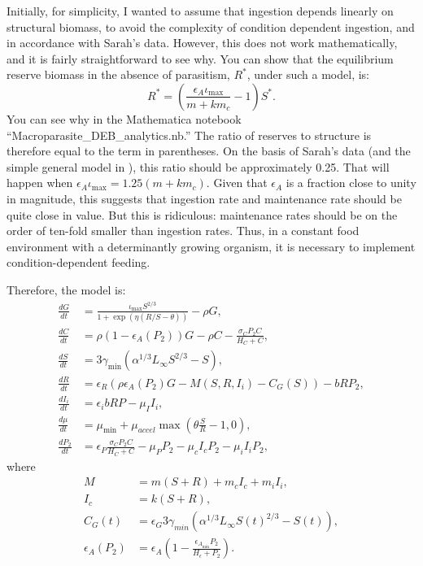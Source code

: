 \documentclass[12pt,reqno,final,pdftex]{amsart}\usepackage[]{graphicx}\usepackage[]{color}
\theoremstyle{plain}
\numberwithin{equation}{part}
\begin{document}
Initially, for simplicity, I wanted to assume that ingestion depends linearly on structural biomass, to avoid the complexity of condition dependent ingestion, and in accordance with Sarah's data.
However, this does not work mathematically, and it is fairly straightforward to see why.
You can show that the equilibrium reserve biomass in the absence of parasitism, $R^*$, under such a model, is:
\begin{equation}
R^* = \left(\frac{\epsilon_A \iota_{\max}}{m + k m_c} - 1 \right) S^*.
\end{equation}
You can see why in the Mathematica notebook ``Macroparasite\_DEB\_analytics.nb.''
The ratio of reserves to structure is therefore equal to the term in parentheses.
On the basis of Sarah's data (and the simple general model in \citep{deRoos2013}), this ratio should be approximately 0.25.
That will happen when $\epsilon_A \iota_{\max} = 1.25(m + k m_c)$. Given that $\epsilon_A$ is a fraction close to unity in magnitude, this suggests that ingestion rate and maintenance rate should be quite close in value.
But this is ridiculous: maintenance rates should be on the order of ten-fold smaller than ingestion rates.
Thus, in a constant food environment with a determinantly growing organism, it is necessary to implement condition-dependent feeding.

Therefore, the model is:
\begin{align}
\frac{dG}{dt} &= \frac{\iota_{\max}S^{2/3}}{1 + \exp\left(\eta(R/S-\theta)\right)} - \rho G, \\
\frac{dC}{dt} &= \rho (1-\epsilon_A(P_2))G - \rho C - \frac{\sigma_C P_2 C}{H_C + C}, \\
\frac{dS}{dt} &= 3\gamma_{\min} \left(\alpha^{1/3}L_{\infty }S^{2/3}-S\right), \\
\frac{dR}{dt} &= \epsilon_R\left(\rho \epsilon_A(P_2) G-M(S,R,I_i)-C_G(S)\right)-b R P_2, \\
\frac{dI_i}{dt} &= \epsilon_ib R P-\mu_II_i, \\
\frac{d\mu}{dt} &= \mu_{\min} + \mu_{accel}\max\left(\theta \frac{S}{R} - 1, 0\right), \\
\frac{dP_2}{dt} &= \epsilon_P \frac{\sigma_C P_2 C}{H_C + C} - \mu_P P_2 - \mu_c I_c P_2 - \mu_i I_i P_2,
\end{align}
where
\begin{align}
M &= m(S+R)+m_cI_c+m_iI_i, \\
I_c &= k(S + R), \\
C_G(t)&=\epsilon_G 3 \gamma_{min}\left(\alpha^{1/3}L_{\infty }S(t)^{2/3}-S(t)\right), \\
\epsilon_A(P_2) &= \epsilon_A\left(1 - \frac{\epsilon_{A_{\min}} P_2}{H_\epsilon + P_2}\right).
\end{align}
\end{document}
